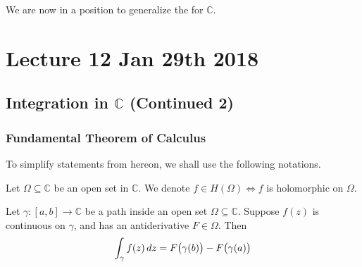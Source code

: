 \documentclass[notoc,notitlepage]{tufte-book}
\begin{document}
We are now in a position to generalize the  for $\mathbb{C}$.




\chapter{Lecture 12 Jan 29th 2018}
	\label{chapter:lecture_12_jan_29th_2018}

\section{Integration in \texorpdfstring{$\mathbb{C}$}{C} (Continued 2)} %
\label{sec:integration_in_c_continued_2}

\subsection{Fundamental Theorem of Calculus} %
\label{sub:fundamental_theorem_of_calculus}

To simplify statements from hereon, we shall use the following notations.

\begin{notation}
	Let $\Omega \subseteq \mathbb{C}$ be an open set in $\mathbb{C}$. We denote $f \in H(\Omega) \iff f $ is holomorphic on $\Omega$.
\end{notation}

\begin{thm}\label{thm:fundamental_theorem_of_calculus}
	Let $\gamma:[a,b] \to \mathbb{C}$ be a path inside an open set $\Omega \subseteq \mathbb{C}$. Suppose $f(z)$ is continuous on $\gamma$, and has an antiderivative $F \in \Omega$. Then
	\begin{equation}
		\label{eq:fundamental_theorem_of_calculus}
		\int_{\gamma} f(z) \mathop{}\!d{z} = F\big(\gamma(b)\big) - F\big(\gamma(a)\big)
	\end{equation}
\end{thm}
\end{document}
